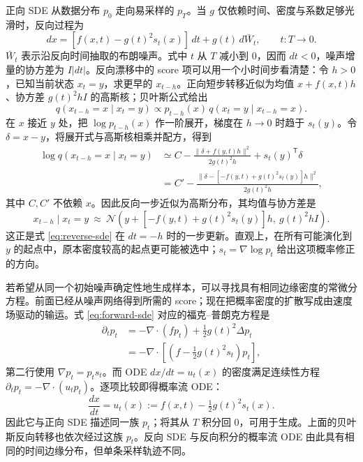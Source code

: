 正向 SDE 从数据分布 \(p_0\) 走向易采样的 \(p_T\)。当 \(g\) 仅依赖时间、密度与系数足够光滑时，反向过程为
\begin{equation}
 dx=[f(x,t)-g(t)^2s_t(x)]\,dt+g(t)\,d\bar W_t,\qquad t:T\to0.
 \label{eq:reverse-sde}
\end{equation}
\(\bar W_t\) 表示沿反向时间抽取的布朗噪声。式中 \(t\) 从 \(T\) 减小到 0，因而 \(dt<0\)，噪声增量的协方差为 \(I|dt|\)。反向漂移中的 score 项可以用一个小时间步看清楚：令 \(h>0\)，已知当前状态 \(x_t=y\)，求更早的 \(x_{t-h}\)。正向短步转移近似为均值 \(x+f(x,t)h\)、协方差 \(g(t)^2hI\) 的高斯核；贝叶斯公式给出
\begin{equation}
 q(x_{t-h}=x\mid x_t=y)\propto p_{t-h}(x)\,q(x_t=y\mid x_{t-h}=x).
 \label{eq:reverse-bayes-step}
\end{equation}
在 \(x\) 接近 \(y\) 处，把 \(\log p_{t-h}(x)\) 作一阶展开，梯度在 \(h\to0\) 时趋于 \(s_t(y)\)。令 \(\delta=x-y\)，将展开式与高斯核相乘并配方，得到
\begin{equation}
\begin{aligned}
 \log q(x_{t-h}=x\mid x_t=y)
 &\simeq C-\frac{\|\delta+f(y,t)h\|^2}{2g(t)^2h}+s_t(y)^\mathsf T\delta\\
 &=C'-\frac{\|\delta-[-f(y,t)+g(t)^2s_t(y)]h\|^2}{2g(t)^2h},
\end{aligned}
 \label{eq:reverse-complete-square}
\end{equation}
其中 \(C,C'\) 不依赖 \(x\)。因此反向一步近似为高斯分布，其均值与协方差是
\begin{equation}
 x_{t-h}\mid x_t=y\ \approx\ \mathcal N\!\left(y+[-f(y,t)+g(t)^2s_t(y)]h,\ g(t)^2hI\right).
 \label{eq:reverse-step-kernel}
\end{equation}
这正是式 \eqref{eq:reverse-sde} 在 \(dt=-h\) 时的一步更新。直观上，在所有可能演化到 \(y\) 的起点中，原本密度较高的起点更可能被选中；\(s_t=\nabla\log p_t\) 给出这项概率修正的方向。

若希望从同一个初始噪声确定性地生成样本，可以寻找具有相同边缘密度的常微分方程。前面已经从噪声网络得到所需的 score；现在把概率密度的扩散写成由速度场驱动的输运。式 \eqref{eq:forward-sde} 对应的福克--普朗克方程是
\begin{align}
 \partial_t p_t
 &=-\nabla\cdot(f p_t)+\tfrac12g(t)^2\Delta p_t\\
 &=-\nabla\cdot\left[\left(f-\tfrac12g(t)^2s_t\right)p_t\right],
 \label{eq:fokker-planck-flow}
\end{align}
第二行使用 \(\nabla p_t=p_ts_t\)。而 ODE \(dx/dt=u_t(x)\) 的密度满足连续性方程 \(\partial_tp_t=-\nabla\cdot(u_tp_t)\)。逐项比较即得概率流 ODE：
\begin{equation}
 \frac{dx}{dt}=u_t(x):=f(x,t)-\tfrac12g(t)^2s_t(x).
 \label{eq:probability-flow}
\end{equation}
因此它与正向 SDE 描述同一族 \(p_t\)；将其从 \(T\) 积分回 0，可用于生成。上面的贝叶斯反向转移也依次经过这族 \(p_t\)。反向 SDE 与反向积分的概率流 ODE 由此具有相同的时间边缘分布，但单条采样轨迹不同。

